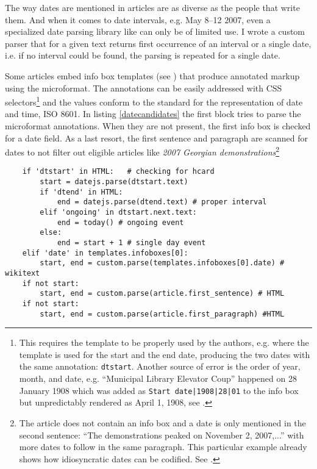The way dates are mentioned in articles are as diverse as the people that write them.
And when it comes to date intervals, e.g. May 8--12 2007, even a specialized date parsing library like  can only be of limited use.
I wrote a custom parser that for a given text returns first occurrence of an interval or a single date, i.e. if no interval could be found, the parsing is repeated for a single date.

Some articles embed info box templates (see ) that produce annotated markup using the  microformat.
The annotations can be easily addressed with \ac{CSS} selectors\footnote{This requires the template to be properly used by the authors, e.g.  where  the template  is used for the start and the end date, producing the two dates with the same annotation: \verb"dtstart". Another source of error is the order of year, month, and date, e.g. ``Municipal Library Elevator Coup'' happened on 28 January 1908 which was added as  \verb"Start date|1908|28|01" to the info box but unpredictably rendered as April 1, 1908, see .} and the values conform to the standard for the representation of date and time, \ac{ISO} 8601.
In listing \ref{datecandidates} the first block tries to parse the microformat annotations.
When they are not present, the first info box is checked for a date field.
As a last resort, the first sentence and paragraph are scanned for dates to not filter out eligible articles like \emph{2007 Georgian demonstrations}\footnote{The article does not contain an info box and a date is only mentioned in the second sentence: ``The demonstrations peaked on November 2, 2007,...'' with more dates to follow in the same paragraph. This particular example already shows how idiosyncratic dates can be codified. See .}

\begin{lstlisting}
	if 'dtstart' in HTML:	# checking for hcard
		start = datejs.parse(dtstart.text)
		if 'dtend' in HTML:
			end = datejs.parse(dtend.text) # proper interval
		elif 'ongoing' in dtstart.next.text:
			end = today() # ongoing event
		else:
			end = start + 1 # single day event
	elif 'date' in templates.infoboxes[0]:
		start, end = custom.parse(templates.infoboxes[0].date) # wikitext
	if not start:
		start, end = custom.parse(article.first_sentence) # HTML
	if not start:
		start, end = custom.parse(article.first_paragraph) #HTML
\end{lstlisting}

